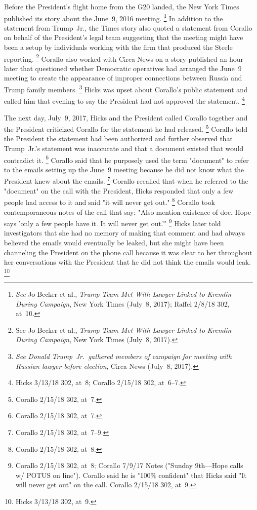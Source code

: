 Before the President's flight home from the G20 landed, the New York Times published its story about the June~9, 2016 meeting.%
\footnote{\textit{See} Jo Becker et al., \textit{Trump Team Met With Lawyer Linked to Kremlin During Campaign}, New York Times (July~8, 2017);
Raffel 2/8/18 302, at~10.}
In addition to the statement from Trump~Jr., the Times story also quoted a statement from Corallo on behalf of the President's legal team suggesting that the meeting might have been a setup by individuals working with the firm that produced the Steele reporting.%
\footnote{See Jo Becker et al., \textit{Trump Team Met With Lawyer Linked to Kremlin During Campaign}, New York Times (July~8, 2017).}
Corallo also worked with Circa News on a story published an hour later that questioned whether Democratic operatives had arranged the June~9 meeting to create the appearance of improper connections between Russia and Trump family members.%
\footnote{\textit{See Donald Trump~Jr.\ gathered members of campaign for meeting with Russian lawyer before election}, Circa News (July~8, 2017).}
Hicks was upset about Corallo's public statement and called him that evening to say the President had not approved the statement.%
\footnote{Hicks 3/13/18 302, at~8;
Corallo 2/15/18 302, at~6--7.}

The next day, July~9, 2017, Hicks and the President called Corallo together and the President criticized Corallo for the statement he had released.%
\footnote{Corallo 2/15/18 302, at~7.}
Corallo told the President the statement had been authorized and further observed that Trump~Jr.'s statement was inaccurate and that a document existed that would contradict it.%
\footnote{Corallo 2/15/18 302, at~7.}
Corallo said that he purposely used the term "document" to refer to the emails setting up the June~9 meeting because he did not know what the President knew about the emails.%
\footnote{Corallo 2/15/18 302, at~7--9.}
Corallo recalled that when he referred to the "document" on the call with the President, Hicks responded that only a few people had access to it and said "it will never get out."%
\footnote{Corallo 2/15/18 302, at~8.}
Corallo took contemporaneous notes of the call that say:
"Also mention existence of doc.
Hope says 'only a few people have it.
It will never get out.'\thinspace"%
\footnote{Corallo 2/15/18 302, at~8;
Corallo 7/9/17 Notes ("Sunday 9th---Hope calls w/ POTUS on line").
Corallo said he is "100\% confident" that Hicks said "It will never get out" on the call.
Corallo 2/15/18 302, at~9.}
Hicks later told investigators that she had no memory of making that comment and had always believed the emails would eventually be leaked, but she might have been channeling the President on the phone call because it was clear to her throughout her conversations with the President that he did not think the emails would leak.%
\footnote{Hicks 3/13/18 302, at~9.}

